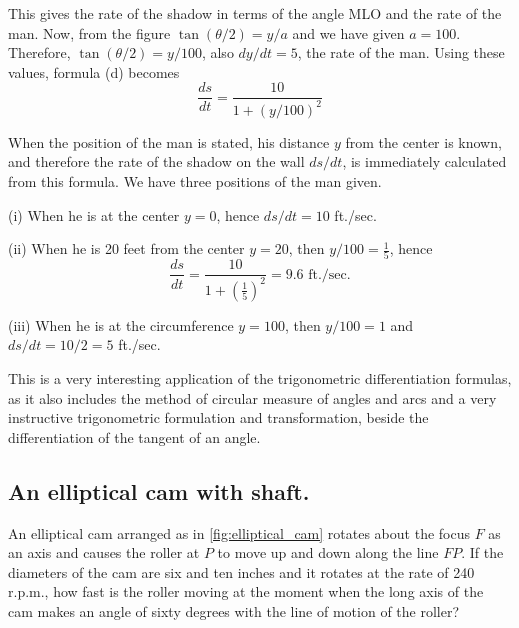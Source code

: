 This gives the rate of the shadow in terms of the angle MLO and the rate of the man. Now, from the figure $\tan(\theta/2)=y/a$ and we have given $a=100$. Therefore, $\tan(\theta/2)=y/100$, also $dy/dt=5$, the rate of the man. Using these values, formula (d) becomes
\begin{equation*}
\frac{ds}{dt} = \frac{10}{1+(y/100)^2}
\end{equation*}

When the position of the man is stated, his distance $y$ from the center is known, and therefore the rate of the shadow on the wall $ds/dt$, is immediately calculated from this formula. We have three positions of the man given.

(i) When he is at the center $y=0$, hence $ds/dt=10$ ft./sec.

(ii) When he is 20 feet from the center $y=20$, then $y/100=\frac{1}{5}$, hence
\begin{equation*}
\frac{ds}{dt} = \frac{10}{1+(\frac{1}{5})^2} = 9.6\text{ ft./sec.}
\end{equation*}

(iii) When he is at the circumference $y=100$, then $y/100=1$ and $ds/dt=10/2=5$ ft./sec.

This is a very interesting application of the trigonometric differentiation formulas, as it also includes the method of circular measure of angles and arcs and a very instructive trigonometric formulation and transformation, beside the differentiation of the tangent of an angle.

\subsection*{An elliptical cam with shaft.}

An elliptical cam arranged as in \autoref{fig:elliptical_cam} rotates about the focus $F$ as an axis and causes the roller at $P$ to move up and down along the line $FP$. If the diameters of the cam are six and ten inches and it rotates at the rate of 240 r.p.m., how fast is the roller moving at the moment when the long axis of the cam makes an angle of sixty degrees with the line of motion of the roller?

